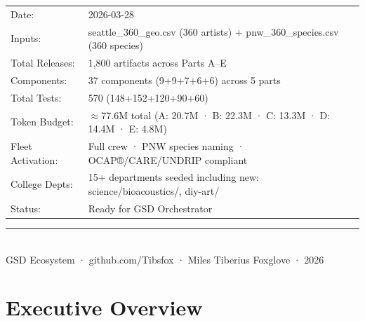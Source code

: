 \documentclass[11pt,letterpaper]{article}
\begin{document}
\begin{center}
\vspace{1.5cm}
\begin{tabular}{ll}
\textcolor{subtlegray}{\sffamily\small Date:} & \textcolor{darktext}{\sffamily\small 2026-03-28} \\[3pt]
\textcolor{subtlegray}{\sffamily\small Inputs:} & \textcolor{darktext}{\sffamily\small seattle\_360\_geo.csv (360 artists) + pnw\_360\_species.csv (360 species)} \\[3pt]
\textcolor{subtlegray}{\sffamily\small Total Releases:} & \textcolor{darktext}{\sffamily\small 1,800 artifacts across Parts A–E} \\[3pt]
\textcolor{subtlegray}{\sffamily\small Components:} & \textcolor{darktext}{\sffamily\small 37 components (9+9+7+6+6) across 5 parts} \\[3pt]
\textcolor{subtlegray}{\sffamily\small Total Tests:} & \textcolor{darktext}{\sffamily\small 570 (148+152+120+90+60)} \\[3pt]
\textcolor{subtlegray}{\sffamily\small Token Budget:} & \textcolor{darktext}{\sffamily\small $\approx$77.6M total (A: 20.7M · B: 22.3M · C: 13.3M · D: 14.4M · E: 4.8M)} \\[3pt]
\textcolor{subtlegray}{\sffamily\small Fleet Activation:} & \textcolor{darktext}{\sffamily\small Full crew · PNW species naming · OCAP®/CARE/UNDRIP compliant} \\[3pt]
\textcolor{subtlegray}{\sffamily\small College Depts:} & \textcolor{darktext}{\sffamily\small 15+ departments seeded including new: science/bioacoustics/, diy-art/} \\[3pt]
\textcolor{subtlegray}{\sffamily\small Status:} & \textcolor{darktext}{\sffamily\small Ready for GSD Orchestrator} \\
\end{tabular}

\vspace{1.5cm}
\textcolor{bordergray}{\rule{9cm}{0.4pt}}\\[0.3em]
{\small\sffamily\textcolor{subtlegray}{GSD Ecosystem · github.com/Tibsfox · Miles Tiberius Foxglove · 2026}}
\end{center}
\newpage

\tableofcontents
\newpage

\section{Executive Overview}
\end{document}
